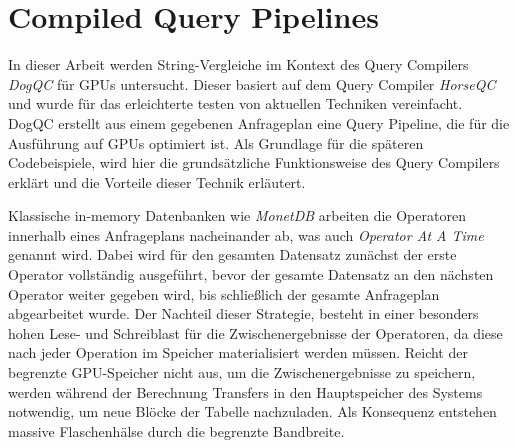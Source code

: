 \chapter{Compiled Query Pipelines}
\label{sec:pipelining}

In dieser Arbeit werden String-Vergleiche im Kontext des Query Compilers \emph{DogQC} für GPUs untersucht.
Dieser basiert auf dem Query Compiler \emph{HorseQC} \cite{Funke2018} und wurde für das erleichterte testen von aktuellen Techniken vereinfacht.
DogQC erstellt aus einem gegebenen Anfrageplan eine Query Pipeline, die für die Ausführung auf GPUs optimiert ist.
Als Grundlage für die späteren Codebeispiele, wird hier die grundsätzliche Funktionsweise des Query Compilers erklärt und die Vorteile dieser Technik erläutert.

Klassische in-memory Datenbanken wie \emph{MonetDB} arbeiten die Operatoren innerhalb eines Anfrageplans nacheinander ab, was auch \emph{Operator At A Time} genannt wird.
Dabei wird für den gesamten Datensatz zunächst der erste Operator vollständig ausgeführt, bevor der gesamte Datensatz an den nächsten Operator weiter gegeben wird, bis schließlich der gesamte Anfrageplan abgearbeitet wurde.
Der Nachteil dieser Strategie, besteht in einer besonders hohen Lese- und Schreiblast für die Zwischenergebnisse der Operatoren, da diese nach jeder Operation im Speicher materialisiert werden müssen.
Reicht der begrenzte GPU-Speicher nicht aus, um die Zwischenergebnisse zu speichern, werden während der Berechnung Transfers in den Hauptspeicher des Systems notwendig, um neue Blöcke der Tabelle nachzuladen.
Als Konsequenz entstehen massive Flaschenhälse durch die begrenzte Bandbreite.

